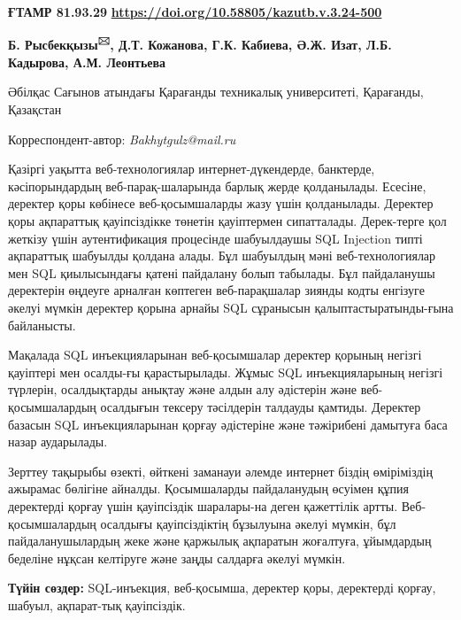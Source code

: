 \newpage
{\bfseries ҒТАМР 81.93.29}
\hfill {\bfseries \href{https://doi.org/10.58805/kazutb.v.3.24-500}{https://doi.org/10.58805/kazutb.v.3.24-500}}

\begin{center}

{\bfseries Б. Рысбекқызы\textsuperscript{🖂}, Д.Т. Кожанова, Г.К. Кабиева,
Ә.Ж. Изат, Л.Б. Кадырова, А.М. Леонтьева}

Әбілқас Сағынов атындағы Қарағанды техникалық университеті, Қарағанды,
Қазақстан
\end{center}
Корреспондент-автор: \emph{Bakhytgulz@mail.ru}\vspace{0.5cm}

Қазіргі уақытта веб-технологиялар интернет-дүкендерде, банктерде,
кәсіпорындардың веб-парақ-шаларында барлық жерде қолданылады. Есесіне,
деректер қоры көбінесе веб-қосымшаларды жазу үшін қолданылады. Деректер
қоры ақпараттық қауіпсіздікке төнетін қауіптермен сипатталады.
Дерек-терге қол жеткізу үшін аутентификация процесінде шабуылдаушы SQL
Injection типті ақпараттық шабуылды қолдана алады. Бұл шабуылдың мәні
веб-технологиялар мен SQL қиылысындағы қатені пайдалану болып табылады.
Бұл пайдаланушы деректерін өңдеуге арналған көптеген веб-парақшалар
зиянды кодты енгізуге әкелуі мүмкін деректер қорына арнайы SQL сұранысын
қалыптастыратынды-ғына байланысты.

Мақалада SQL инъекцияларынан веб-қосымшалар деректер қорының негізгі
қауіптері мен осалды-ғы қарастырылады. Жұмыс SQL инъекцияларының негізгі
түрлерін, осалдықтарды анықтау және алдын алу әдістерін және
веб-қосымшалардың осалдығын тексеру тәсілдерін талдауды қамтиды.
Деректер базасын SQL инъекцияларынан қорғау әдістеріне және тәжірибені
дамытуға баса назар аударылады.

Зерттеу тақырыбы өзекті, өйткені заманауи әлемде интернет біздің
өміріміздің ажырамас бөлігіне айналды. Қосымшаларды пайдаланудың өсуімен
құпия деректерді қорғау үшін қауіпсіздік шаралары-на деген қажеттілік
артты. Веб-қосымшалардың осалдығы қауіпсіздіктің бұзылуына әкелуі
мүмкін, бұл пайдаланушылардың жеке және қаржылық ақпаратын жоғалтуға,
ұйымдардың беделіне нұқсан келтіруге және заңды салдарға әкелуі мүмкін.

{\bfseries Түйін сөздер:} SQL-инъекция, веб-қосымша, деректер қоры,
деректерді қорғау, шабуыл, ақпарат-тық қауіпсіздік.


